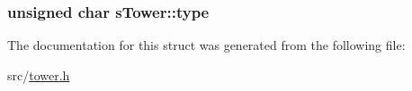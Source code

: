 \subsubsection[{type}]{\setlength{\rightskip}{0pt plus 5cm}unsigned char s\+Tower\+::type}\label{structs_tower_a3891f13f52d26c0661d516777f847ff8}


The documentation for this struct was generated from the following file\+:\begin{DoxyCompactItemize}
\item 
src/\hyperlink{tower_8h}{tower.\+h}\end{DoxyCompactItemize}
